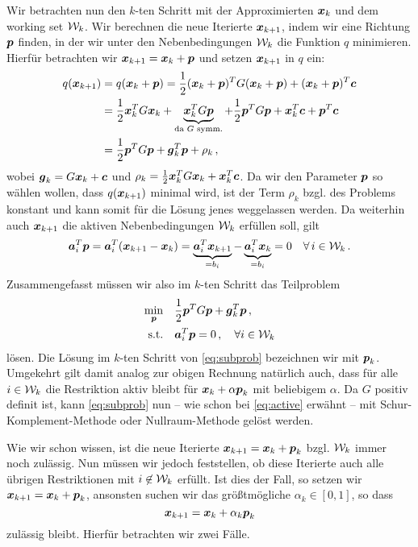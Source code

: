Wir betrachten nun den $k$-ten Schritt mit der Approximierten $\boldsymbol x_k$ und dem working set $\mathcal W_k$. Wir berechnen die neue Iterierte $\boldsymbol x_{k+1}$, indem wir eine Richtung $\boldsymbol p$ finden, in der wir unter den Nebenbedingungen $\mathcal W_k$ die Funktion $q$ minimieren. Hierfür betrachten wir $\boldsymbol x_{k+1} = \boldsymbol x_k + \boldsymbol p$ und setzen $\boldsymbol x_{k+1}$ in $q$ ein:
\begin{align*}
	 q(\boldsymbol x_{k+1}) & = q(\boldsymbol x_k+\boldsymbol p) = \frac 1 2 (\boldsymbol x_k + \boldsymbol p)^T G (\boldsymbol x_k + \boldsymbol p) + (\boldsymbol x_k + \boldsymbol p)^T \boldsymbol c \\
	& = \frac 1 2 \boldsymbol x^T_k G \boldsymbol x_k + \underbrace{\boldsymbol x_k^T G \boldsymbol p}_{\text{da $G$ symm.}} + \frac 1 2 \boldsymbol p^T G\boldsymbol p +\boldsymbol x_k^T \boldsymbol c +\boldsymbol p^T \boldsymbol c \\
	& = \frac 1 2\boldsymbol p^T G \boldsymbol p +\boldsymbol  g_k^T \boldsymbol p + \rho_k \, ,
\end{align*}
wobei $\boldsymbol g_k = G\boldsymbol x_k+\boldsymbol c$ und $\rho_k = \frac 1 2 \boldsymbol x_k^T G \boldsymbol x_k + \boldsymbol x_k^T \boldsymbol c$. Da wir den Parameter $\boldsymbol p$ so wählen wollen, dass $q(\boldsymbol x_{k+1})$ minimal wird, ist der Term $\rho_k$ bzgl. des Problems konstant und  kann somit für die Lösung jenes weggelassen werden. Da weiterhin auch $\boldsymbol x_{k+1}$ die aktiven Nebenbedingungen $\mathcal W_k$ erfüllen soll, gilt
\[
	\boldsymbol a_i^T \boldsymbol p =\boldsymbol a_i^T (\boldsymbol x_{k+1} - \boldsymbol x_k) = \underbrace{\boldsymbol a_i^T\boldsymbol x_{k+1}}_{=b_i} - \underbrace{\boldsymbol a_i^T \boldsymbol x_k}_{=b_i} = 0 \quad \forall \, i \in \mathcal W_k \, .
\]
Zusammengefasst müssen wir also im $k$-ten Schritt das Teilproblem
\begin{align}\label{eq:subprob}
\begin{aligned}
	\min_{\boldsymbol p} & \quad \frac 1 2\boldsymbol p^T G \boldsymbol p + \boldsymbol g_k^T \boldsymbol p \, , \\
	\text{s.t.} & \quad \boldsymbol a_i^T\boldsymbol p = 0 \, , \quad \forall i \in \mathcal W_k 
\end{aligned}
\end{align}
lösen. Die Lösung im $k$-ten Schritt von \eqref{eq:subprob} bezeichnen wir mit $\boldsymbol p_k$. Umgekehrt gilt damit analog zur obigen Rechnung natürlich auch, dass für alle $i \in \mathcal W_k$ die Restriktion aktiv bleibt für $\boldsymbol x_k + \alpha \boldsymbol p_k$ mit beliebigem $\alpha$. Da $G$ positiv definit ist, kann \eqref{eq:subprob} nun – wie schon bei \eqref{eq:active} erwähnt – mit Schur-Komplement-Methode oder Nullraum-Methode gelöst werden.

Wie wir schon wissen, ist die neue Iterierte $\boldsymbol x_{k+1} = \boldsymbol x_k + \boldsymbol p_k$ bzgl. $\mathcal W_k$ immer noch zulässig. Nun müssen wir jedoch feststellen, ob diese Iterierte auch alle übrigen Restriktionen mit $i\not\in \mathcal W_k$ erfüllt. Ist dies der Fall, so setzen wir $\boldsymbol x_{k+1} = \boldsymbol x_k +\boldsymbol p_k$, ansonsten suchen wir das größtmögliche $\alpha_k \in [0,1]$, so dass
\[
	\boldsymbol x_{k+1} =\boldsymbol x_k + \alpha_k \boldsymbol p_k
\] 
zulässig bleibt. Hierfür betrachten wir zwei Fälle.


